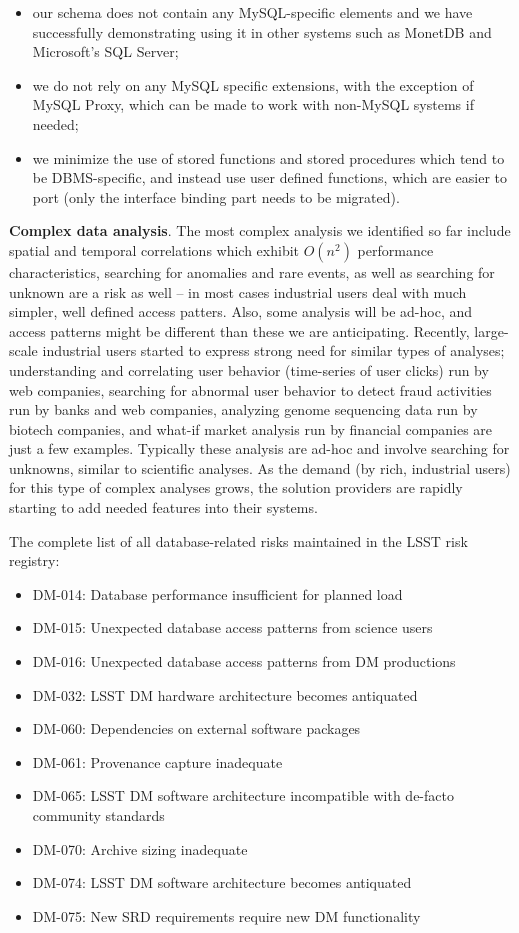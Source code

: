 \documentclass[DM,lsstdraft,toc]{lsstdoc}
\begin{document}
\begin{itemize}
\item
  our schema does not contain any MySQL-specific elements and we have
  successfully demonstrating using it in other systems such as MonetDB
  and Microsoft's SQL Server;
\item
  we do not rely on any MySQL specific extensions, with the exception of
  MySQL Proxy, which can be made to work with non-MySQL systems if
  needed;
\item
  we minimize the use of stored functions and stored procedures which
  tend to be DBMS-specific, and instead use user defined functions,
  which are easier to port (only the interface binding part needs to be
  migrated).
\end{itemize}

\textbf{Complex data analysis}. The most complex analysis we identified
so far include spatial and temporal correlations which exhibit
\(O(n^2)\) performance characteristics, searching for anomalies and rare
events, as well as searching for unknown are a risk as well -- in most
cases industrial users deal with much simpler, well defined access
patters. Also, some analysis will be ad-hoc, and access patterns might
be different than these we are anticipating. Recently, large-scale
industrial users started to express strong need for similar types of
analyses; understanding and correlating user behavior (time-series of
user clicks) run by web companies, searching for abnormal user behavior
to detect fraud activities run by banks and web companies, analyzing
genome sequencing data run by biotech companies, and what-if market
analysis run by financial companies are just a few examples. Typically
these analysis are ad-hoc and involve searching for unknowns, similar to
scientific analyses. As the demand (by rich, industrial users) for this
type of complex analyses grows, the solution providers are rapidly
starting to add needed features into their systems.

The complete list of all database-related risks maintained in the LSST
risk registry:

\begin{itemize}
\item
  DM-014: Database performance insufficient for planned load
\item
  DM-015: Unexpected database access patterns from science users
\item
  DM-016: Unexpected database access patterns from DM productions
\item
  DM-032: LSST DM hardware architecture becomes antiquated
\item
  DM-060: Dependencies on external software packages
\item
  DM-061: Provenance capture inadequate
\item
  DM-065: LSST DM software architecture incompatible with de-facto
  community standards
\item
  DM-070: Archive sizing inadequate
\item
  DM-074: LSST DM software architecture becomes antiquated
\item
  DM-075: New SRD requirements require new DM functionality
\end{itemize}
\end{document}

